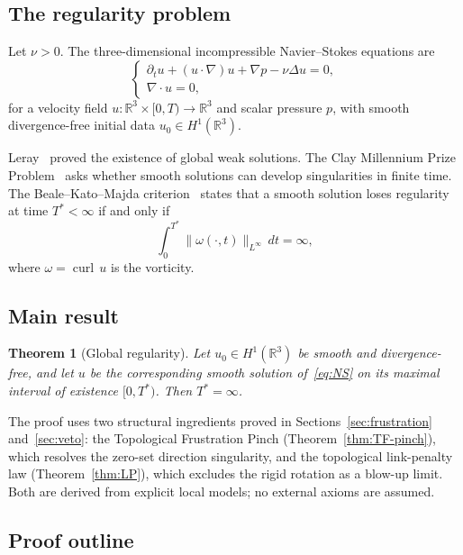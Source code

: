 \documentclass[12pt, reqno]{amsart}
\newtheorem{theorem}{Theorem}[section]
\theoremstyle{definition}
\theoremstyle{remark}
\numberwithin{equation}{section}
\newcommand{\R}{\mathbb{R}}
\DeclareMathOperator{\curl}{curl}
\begin{document}
\subsection{The regularity problem}

Let $\nu>0$.  The three-dimensional incompressible Navier--Stokes
equations are
\begin{equation}\label{eq:NS}
\begin{cases}
\partial_t u + (u\cdot\nabla)u + \nabla p - \nu\Delta u = 0,\\[3pt]
\nabla\cdot u = 0,
\end{cases}
\end{equation}
for a velocity field $u\colon\R^3\times[0,T)\to\R^3$ and scalar
pressure $p$, with smooth divergence-free initial data
$u_0\in H^1(\R^3)$.

Leray~\cite{Leray1934} proved the existence of global weak solutions.
The Clay Millennium Prize Problem~\cite{Fefferman2006} asks whether
smooth solutions can develop singularities in finite time.
The Beale--Kato--Majda criterion~\cite{BKM1984} states that a smooth
solution loses regularity at time $T^*<\infty$ if and only if
\begin{equation}\label{eq:BKM}
\int_0^{T^*}\|\omega(\cdot,t)\|_{L^\infty}\,dt = \infty,
\end{equation}
where $\omega=\curl\,u$ is the vorticity.

\subsection{Main result}

\begin{theorem}[Global regularity]\label{thm:main}
Let $u_0\in H^1(\R^3)$ be smooth and divergence-free, and let $u$ be
the corresponding smooth solution of~\eqref{eq:NS} on its maximal
interval of existence $[0,T^*)$.  Then $T^*=\infty$.
\end{theorem}

The proof uses two structural ingredients proved in
Sections~\ref{sec:frustration} and~\ref{sec:veto}:
the Topological Frustration Pinch (Theorem~\ref{thm:TF-pinch}), which
resolves the zero-set direction singularity, and the topological
link-penalty law (Theorem~\ref{thm:LP}), which excludes the rigid
rotation as a blow-up limit.  Both are derived from explicit local
models; no external axioms are assumed.

\subsection{Proof outline}
\end{document}
